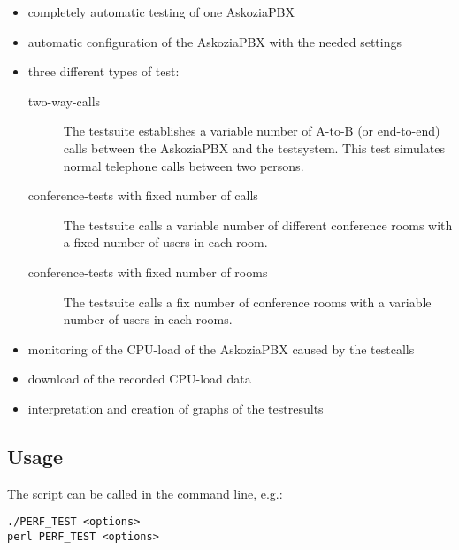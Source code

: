 \begin{itemize}
\item completely automatic testing of one AskoziaPBX
\item automatic configuration of the AskoziaPBX with the needed settings
\item three different types of test:
	\begin{description}
	\item [two-way-calls] The testsuite establishes a variable number of A-to-B (or end-to-end) calls between the AskoziaPBX and the testsystem. This test simulates normal telephone calls between two persons.
	
	\item [conference-tests with fixed number of calls] The testsuite calls a variable number of different conference rooms with a fixed number of users in each room.

	\item [conference-tests with fixed number of rooms] The testsuite calls a fix number of conference rooms with a variable number of users in each rooms.
	\end{description}
	
\item monitoring of the CPU-load of the AskoziaPBX caused by the testcalls
\item download of the recorded CPU-load data
\item interpretation and creation of graphs of the testresults 
\end{itemize}

\subsection{Usage}%
The script can be called in the command line, e.g.: 

\begin{lstlisting}[breaklines=true,label=code:script-call,caption={Aufruf des Scripts} ]
./PERF_TEST <options>
perl PERF_TEST <options>
\end{lstlisting}

